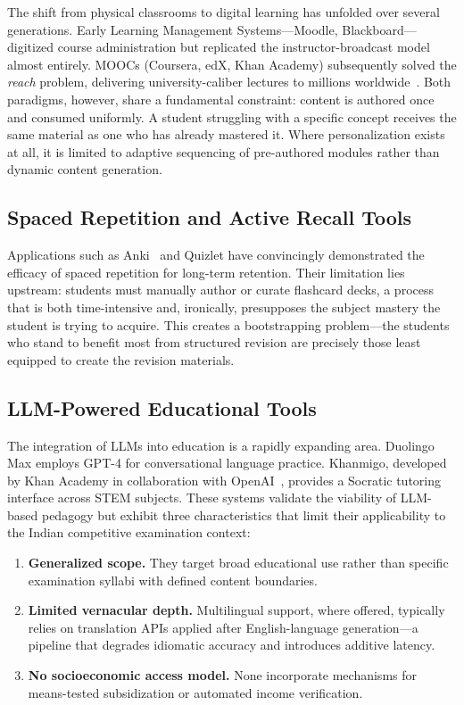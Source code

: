 \documentclass[conference]{IEEEtran}
\begin{document}
The shift from physical classrooms to digital learning has unfolded over several generations. Early Learning Management Systems---Moodle, Blackboard---digitized course administration but replicated the instructor-broadcast model almost entirely. MOOCs (Coursera, edX, Khan Academy) subsequently solved the \textit{reach} problem, delivering university-caliber lectures to millions worldwide~\cite{vercel_nextjs}. Both paradigms, however, share a fundamental constraint: content is authored once and consumed uniformly. A student struggling with a specific concept receives the same material as one who has already mastered it. Where personalization exists at all, it is limited to adaptive sequencing of pre-authored modules rather than dynamic content generation.

\subsection{Spaced Repetition and Active Recall Tools}

Applications such as Anki~\cite{anki} and Quizlet have convincingly demonstrated the efficacy of spaced repetition for long-term retention. Their limitation lies upstream: students must manually author or curate flashcard decks, a process that is both time-intensive and, ironically, presupposes the subject mastery the student is trying to acquire. This creates a bootstrapping problem---the students who stand to benefit most from structured revision are precisely those least equipped to create the revision materials.

\subsection{LLM-Powered Educational Tools}

The integration of LLMs into education is a rapidly expanding area. Duolingo Max employs GPT-4 for conversational language practice. Khanmigo, developed by Khan Academy in collaboration with OpenAI~\cite{khanmigo}, provides a Socratic tutoring interface across STEM subjects. These systems validate the viability of LLM-based pedagogy but exhibit three characteristics that limit their applicability to the Indian competitive examination context:

\begin{enumerate}[leftmargin=*]
    \item \textbf{Generalized scope.} They target broad educational use rather than specific examination syllabi with defined content boundaries.
    \item \textbf{Limited vernacular depth.} Multilingual support, where offered, typically relies on translation APIs applied after English-language generation---a pipeline that degrades idiomatic accuracy and introduces additive latency.
    \item \textbf{No socioeconomic access model.} None incorporate mechanisms for means-tested subsidization or automated income verification.
\end{enumerate}
\end{document}
